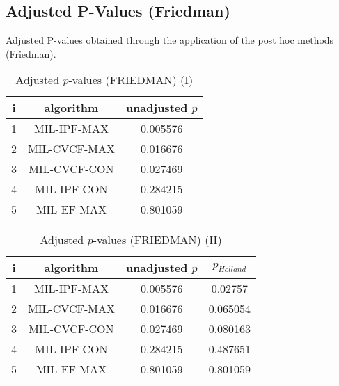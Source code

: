 \documentclass[a4paper,10pt]{article}
\begin{document}
\begin{landscape}
\newpage

\section{Adjusted P-Values (Friedman)}


Adjusted P-values obtained through the application of the post hoc methods (Friedman).

\begin{table}[!htp]
\centering\small
\begin{tabular}{ccc}
i&algorithm&unadjusted $p$\\
\hline1&MIL-IPF-MAX&0.005576\\2&MIL-CVCF-MAX&0.016676\\3&MIL-CVCF-CON&0.027469\\4&MIL-IPF-CON&0.284215\\5&MIL-EF-MAX&0.801059\\\hline
\end{tabular}
\caption{Adjusted $p$-values (FRIEDMAN) (I)}
\end{table}
\begin{table}[!htp]
\centering\small
\begin{tabular}{cccc}
i&algorithm&unadjusted $p$&$p_{Holland}$\\
\hline1&MIL-IPF-MAX&0.005576&0.02757\\2&MIL-CVCF-MAX&0.016676&0.065054\\3&MIL-CVCF-CON&0.027469&0.080163\\4&MIL-IPF-CON&0.284215&0.487651\\5&MIL-EF-MAX&0.801059&0.801059\\\hline
\end{tabular}
\caption{Adjusted $p$-values (FRIEDMAN) (II)}
\end{table}

\newpage
\end{landscape}
\end{document}
